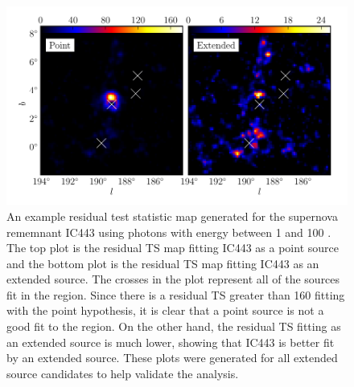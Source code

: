 \documentclass[preprint]{aastex}
\newcommand{\gev}{\text{GeV}\xspace}
\begin{document}
\begin{figure}
  \begin{center}
  \includegraphics{ic443_plots/res_tsmap_ic443.pdf}

  \caption{An example residual test statistic map generated for the
  supernova rememnant IC443 using photons with energy between 1 \gev and
  100 \gev.  The top plot is the residual TS map fitting IC443
  as a point source and the bottom plot is the residual TS map fitting
  IC443 as an extended source. The crosses in the plot represent all of
  the sources fit in the region. Since there is a residual TS greater
  than 160 fitting with the point hypothesis, it is clear that a point
  source is not a good fit to the region. On the other hand,
  the residual TS fitting as an extended source is much lower, showing
  that IC443 is better fit by an extended source. These plots were generated
  for all extended source candidates to help validate the analysis.}
  \label{res_tsmaps}
  \end{center}
\end{figure}
\end{document}
